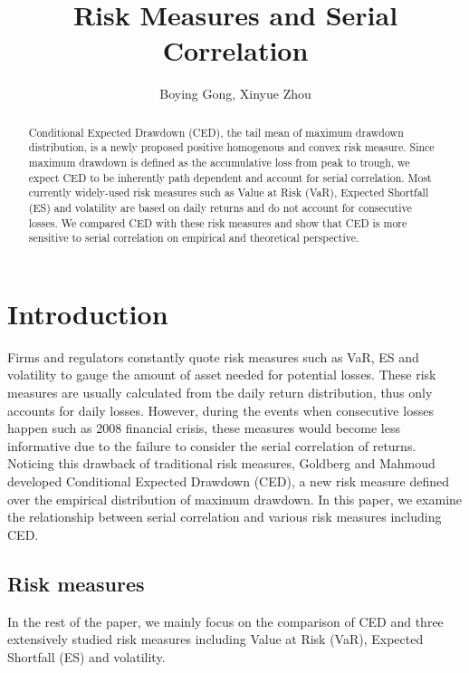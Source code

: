\documentclass[11pt]{article}
\title{Risk Measures and Serial Correlation}
\author{Boying Gong, Xinyue Zhou}
\begin{document}
\maketitle



\begin{abstract}
Conditional Expected Drawdown (CED), the tail mean of maximum drawdown distribution, is a newly proposed positive homogenous and convex risk measure. Since maximum drawdown is defined as the accumulative loss from peak to trough, we expect CED to be inherently path dependent and account for serial correlation. Most currently widely-used risk measures such as Value at Risk (VaR), Expected Shortfall (ES) and volatility are based on daily returns and do not account for consecutive losses. We compared CED with these risk measures and show that CED is more sensitive to serial correlation on empirical and theoretical perspective. 
\end{abstract}

\section{Introduction}

Firms and regulators constantly quote risk measures such as VaR, ES and volatility to gauge the amount of asset needed for potential losses. These risk measures are usually calculated from the daily return distribution, thus only accounts for daily losses. However, during the events when consecutive losses happen such as 2008 financial crisis, these measures would become less informative due to the failure to consider the serial correlation of returns. Noticing this drawback of traditional risk measures, Goldberg and Mahmoud\cite{goldberg2014convex} developed Conditional Expected Drawdown (CED), a new risk measure defined over the empirical distribution of maximum drawdown. In this paper, we examine the relationship between serial correlation and various risk measures including CED. 

\subsection{Risk measures}

In the rest of the paper, we mainly focus on the comparison of CED and three extensively studied risk measures including Value at Risk (VaR), Expected Shortfall (ES) and volatility.
\end{document}

